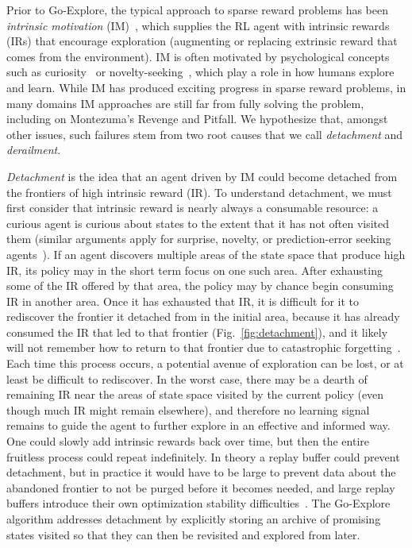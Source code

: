 \documentclass{article}
\begin{document}
Prior to Go-Explore, the typical approach to sparse reward problems has been \textit{intrinsic motivation} (IM)~\cite{bellemare2016unifying,schmidhuber1991possibility,oudeyer2009intrinsic,barto2013intrinsic}, which supplies the RL agent with intrinsic rewards (IRs) that encourage exploration (augmenting or replacing extrinsic reward that comes from the environment). 
IM is often motivated by psychological concepts such as curiosity~\cite{Schmidhuber2006DevelopmentalRO,schmidhuber1991curious} or novelty-seeking~\cite{lehman,conti:arxiv17}, which play a role in how humans explore and learn.
While IM has produced exciting progress in sparse reward problems, in many domains IM approaches are still far from fully solving the problem, including on Montezuma's Revenge and Pitfall.
We hypothesize that, amongst other issues, such failures stem from two root causes that we call \emph{detachment} and \emph{derailment}.

\emph{Detachment} is the idea that an agent driven by IM could become detached from the frontiers of high intrinsic reward (IR).
To understand detachment, we must first consider that intrinsic reward is nearly always a consumable resource: a curious agent is curious about states to the extent that it has not often visited them (similar arguments apply for surprise, novelty, or prediction-error seeking agents~\cite{bellemare2016unifying,Achiam2017SurpriseBasedIM,conti:arxiv17,burda:rnd2018}).
If an agent discovers multiple areas of the state space that produce high IR, its policy may in the short term focus on one such area. After exhausting some of the IR offered by that area, the policy may by chance begin consuming IR in another area. Once it has exhausted that IR, it is difficult for it to rediscover the frontier it detached from in the initial area, because it has already consumed the IR that led to that frontier (Fig.~\ref{fig:detachment}), and it likely will not remember how to return to that frontier due to catastrophic forgetting~\cite{velez2017diffusion, ellefsen2015neural, kirkpatrick2017overcoming,french1999catastrophic}. Each time this process occurs, a potential avenue of exploration can be lost, or at least be difficult to rediscover. In the worst case, there may be a dearth of remaining IR near the areas of state space visited by the current policy (even though much IR might remain elsewhere), and therefore no learning signal remains to guide the agent to further explore in an effective and informed way. One could slowly add intrinsic rewards back over time, but then the entire fruitless process could repeat indefinitely. In theory a replay buffer could prevent detachment, but in practice it would have to be large to prevent data about the abandoned frontier to not be purged before it becomes needed, and large replay buffers introduce their own optimization stability difficulties~\cite{Zhang2017ADL,Liu2017TheEO}. 
The Go-Explore algorithm addresses detachment by explicitly storing an archive of promising states visited so that they can then be revisited and explored from later. 
\end{document}
